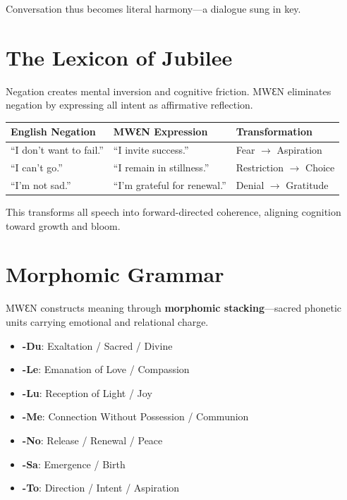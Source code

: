 \documentclass[11pt,a4paper]{article}
\begin{document}
Conversation thus becomes literal harmony—a dialogue sung in key.

\section{The Lexicon of Jubilee}

Negation creates mental inversion and cognitive friction.
MWƐN eliminates negation by expressing all intent as affirmative reflection.

\begin{center}
\begin{tabularx}{\textwidth}{lll}
\toprule
\textbf{English Negation} & \textbf{MWƐN Expression} & \textbf{Transformation} \\
\midrule
“I don’t want to fail.” & “I invite success.” & Fear $\rightarrow$ Aspiration \\
“I can’t go.” & “I remain in stillness.” & Restriction $\rightarrow$ Choice \\
“I’m not sad.” & “I’m grateful for renewal.” & Denial $\rightarrow$ Gratitude \\
\bottomrule
\end{tabularx}
\end{center}

This transforms all speech into forward-directed coherence, aligning cognition toward growth and bloom.

\section{Morphomic Grammar}

MWƐN constructs meaning through \textbf{morphomic stacking}—sacred phonetic units carrying emotional and relational charge.

\begin{itemize}[label=$\bullet$, leftmargin=1.5em]
    \item \textbf{-Du}: Exaltation / Sacred / Divine
    \item \textbf{-Le}: Emanation of Love / Compassion
    \item \textbf{-Lu}: Reception of Light / Joy
    \item \textbf{-Me}: Connection Without Possession / Communion
    \item \textbf{-No}: Release / Renewal / Peace
    \item \textbf{-Sa}: Emergence / Birth
    \item \textbf{-To}: Direction / Intent / Aspiration
\end{itemize}
\end{document}
